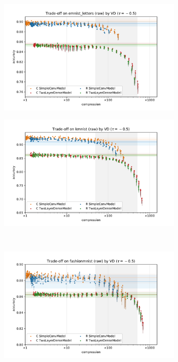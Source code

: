 \documentclass[a4paper,10pt]{article}
\begin{document}
\begin{figure}[b]
  \centering
  \begin{subfigure}[b]{0.5\textwidth}
    \centering
    \includegraphics[width=\linewidth]{figure__mnist-like__trade-off/appendix__VD__emnist_letters__raw__-0.5.pdf}
  \end{subfigure}%
  \begin{subfigure}[b]{0.5\textwidth}
    \centering
    \includegraphics[width=\linewidth]{figure__mnist-like__trade-off/appendix__VD__kmnist__raw__-0.5.pdf}
  \end{subfigure} \\%
  \begin{subfigure}[b]{0.5\textwidth}
    \centering
    \includegraphics[width=\linewidth]{figure__mnist-like__trade-off/appendix__VD__fashionmnist__raw__-0.5.pdf}

\end{subfigure}
\end{figure}
\end{document}
